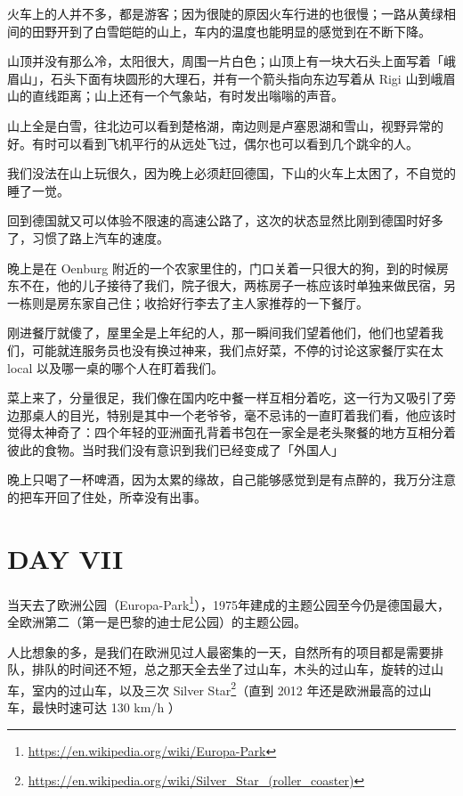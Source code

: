 \documentclass{ctexart}
\newcommand{\IMG}[1]{
	\begin{center}
	\makebox[\textwidth][c]{\texttt{[image: \#1]}}
	\end{center}
}
\newcommand{\IMGT}[2]{
	\begin{center}
	\makebox[\textwidth][c]{\texttt{[image: \#1]}}
	\makebox[\textwidth][r]{\footnotesize#2}
	\end{center}
}
\newcommand{\SECTION}[1]{
	\section*{#1}\addcontentsline{toc}{0}{#1}
}
\begin{document}
\IMGT{eu54.jpg}{火车尾部}

火车上的人并不多，都是游客；因为很陡的原因火车行进的也很慢；一路从黄绿相间的田野开到了白雪皑皑的山上，车内的温度也能明显的感觉到在不断下降。

\IMG{eu55.jpg}

山顶并没有那么冷，太阳很大，周围一片白色；山顶上有一块大石头上面写着「峨眉山」，石头下面有块圆形的大理石，并有一个箭头指向东边写着从 Rigi 山到峨眉山的直线距离；山上还有一个气象站，有时发出嗡嗡的声音。

\IMG{eu56.jpg}

山上全是白雪，往北边可以看到楚格湖，南边则是卢塞恩湖和雪山，视野异常的好。有时可以看到飞机平行的从远处飞过，偶尔也可以看到几个跳伞的人。

\newpage
\IMGT{eu57.jpg}{不时有飞机飞过}

我们没法在山上玩很久，因为晚上必须赶回德国，下山的火车上太困了，不自觉的睡了一觉。

回到德国就又可以体验不限速的高速公路了，这次的状态显然比刚到德国时好多了，习惯了路上汽车的速度。

晚上是在 Oenburg 附近的一个农家里住的，门口关着一只很大的狗，到的时候房东不在，他的儿子接待了我们，院子很大，两栋房子一栋应该时单独来做民宿，另一栋则是房东家自己住；收拾好行李去了主人家推荐的一下餐厅。

刚进餐厅就傻了，屋里全是上年纪的人，那一瞬间我们望着他们，他们也望着我们，可能就连服务员也没有换过神来，我们点好菜，不停的讨论这家餐厅实在太 local 以及哪一桌的哪个人在盯着我们。

菜上来了，分量很足，我们像在国内吃中餐一样互相分着吃，这一行为又吸引了旁边那桌人的目光，特别是其中一个老爷爷，毫不忌讳的一直盯着我们看，他应该时觉得太神奇了：四个年轻的亚洲面孔背着书包在一家全是老头聚餐的地方互相分着彼此的食物。当时我们没有意识到我们已经变成了「外国人」

晚上只喝了一杯啤酒，因为太累的缘故，自己能够感觉到是有点醉的，我万分注意的把车开回了住处，所幸没有出事。

\newpage
\SECTION{DAY VII}

当天去了欧洲公园（Europa-Park\footnote{\url{https://en.wikipedia.org/wiki/Europa-Park}}），1975年建成的主题公园至今仍是德国最大，全欧洲第二（第一是巴黎的迪士尼公园）的主题公园。

人比想象的多，是我们在欧洲见过人最密集的一天，自然所有的项目都是需要排队，排队的时间还不短，总之那天全去坐了过山车，木头的过山车，旋转的过山车，室内的过山车，以及三次 Silver Star\footnote{\url{https://en.wikipedia.org/wiki/Silver_Star_(roller_coaster)}}（直到 2012 年还是欧洲最高的过山车，最快时速可达 130 km/h ）
\end{document}
